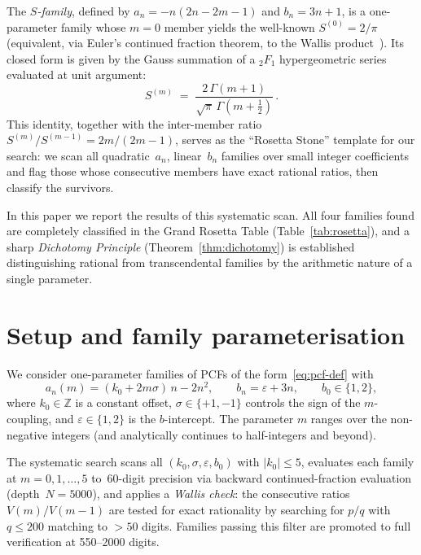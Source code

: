 \documentclass[11pt,a4paper]{article}
\theoremstyle{definition}
\theoremstyle{remark}
\begin{document}
The \emph{$S$-family}, defined by $a_n = -n(2n - 2m - 1)$ and $b_n = 3n+1$,
is a one-parameter family whose $m=0$ member yields the well-known
$S^{(0)} = 2/\pi$ (equivalent, via Euler's continued fraction theorem,
to the Wallis product~\cite{lange1999elementary}).
Its closed form is given by the Gauss summation of a ${}_2F_1$
hypergeometric series evaluated at unit argument:
\begin{equation}\label{eq:s-family}
  S^{(m)} \;=\; \frac{2\,\Gamma(m+1)}{\sqrt{\pi}\,\Gamma(m+\tfrac{1}{2})}\,.
\end{equation}
This identity, together with the inter-member ratio
$S^{(m)}/S^{(m-1)} = 2m/(2m-1)$, serves as the ``Rosetta Stone''
template for our search: we scan all quadratic~$a_n$, linear~$b_n$ families
over small integer coefficients and flag those whose consecutive members
have exact rational ratios, then classify the survivors.

In this paper we report the results of this systematic scan.
All four families found are completely classified in the
Grand Rosetta Table (Table~\ref{tab:rosetta}), and a sharp
\emph{Dichotomy Principle} (Theorem~\ref{thm:dichotomy}) is established
distinguishing rational from transcendental families by the
arithmetic nature of a single parameter.

\section{Setup and family parameterisation}\label{sec:setup}

We consider one-parameter families of PCFs of the form~\eqref{eq:pcf-def}
with
\begin{equation}\label{eq:family-param}
  a_n(m) = (k_0 + 2m\sigma)\,n - 2n^2, \qquad
  b_n = \varepsilon + 3n, \qquad
  b_0 \in \{1,2\},
\end{equation}
where $k_0 \in \mathbb{Z}$ is a constant offset,
$\sigma \in \{+1,-1\}$ controls the sign of the $m$-coupling,
and $\varepsilon \in \{1,2\}$ is the $b$-intercept.
The parameter $m$ ranges over the non-negative integers (and analytically
continues to half-integers and beyond).

The systematic search scans all $(k_0, \sigma, \varepsilon, b_0)$
with $|k_0| \leq 5$, evaluates each family at $m = 0,1,\dotsc,5$
to~60-digit precision via backward continued-fraction evaluation
(depth~$N = 5000$), and applies a \emph{Wallis check}: the consecutive
ratios $V(m)/V(m{-}1)$ are tested for exact rationality by searching
for $p/q$ with $q \leq 200$ matching to $>50$ digits.
Families passing this filter are promoted to full verification at
550--2000 digits.
\end{document}
